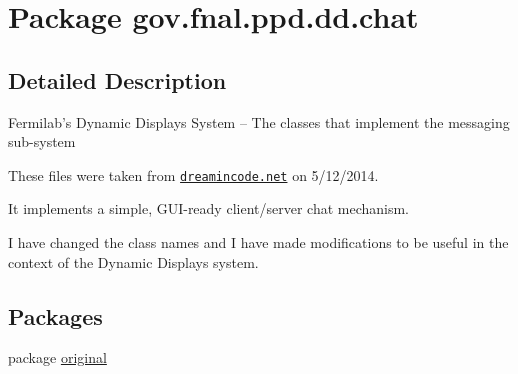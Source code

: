 \hypertarget{namespacegov_1_1fnal_1_1ppd_1_1dd_1_1chat}{\section{Package gov.\-fnal.\-ppd.\-dd.\-chat}
\label{namespacegov_1_1fnal_1_1ppd_1_1dd_1_1chat}
}


\subsection{Detailed Description}
Fermilab's Dynamic Displays System -- The classes that implement the messaging sub-\/system

These files were taken from \href{http://www.dreamincode.net/forums/topic/259777-a-simple-chat-program-with-clientserver-gui-optional/}{\tt dreamincode.\-net} on 5/12/2014.

It implements a simple, G\-U\-I-\/ready client/server chat mechanism.

I have changed the class names and I have made modifications to be useful in the context of the Dynamic Displays system.\subsection*{Packages}
\begin{DoxyCompactItemize}
\item 
package \hyperlink{namespacegov_1_1fnal_1_1ppd_1_1dd_1_1chat_1_1original}{original}
\end{DoxyCompactItemize}
